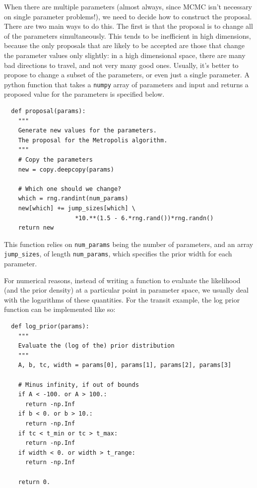 When there are multiple parameters (almost always, since MCMC isn't necessary
on single parameter problems!), we need to decide how to construct the proposal.
There are two main ways to do this. The first is that the proposal is to
change all of the parameters simultaneously. This tends to be inefficient in
high dimensions, because the only proposals that are likely to be accepted
are those that change the parameter values only slightly: in a high dimensional
space, there are many bad directions to travel, and not very many good ones.
Usually, it's better to propose to change a subset of the parameters, or even
just a single parameter. A python function that takes a {\tt numpy} array of
parameters and input and returns a proposed value for the parameters is
specified below.

\begin{verbatim}
  def proposal(params):
    """
    Generate new values for the parameters.
    The proposal for the Metropolis algorithm.
    """
    # Copy the parameters
    new = copy.deepcopy(params)

    # Which one should we change?
    which = rng.randint(num_params)
    new[which] += jump_sizes[which] \
                    *10.**(1.5 - 6.*rng.rand())*rng.randn()
    return new
\end{verbatim}
This function relies on {\tt num\_params} being the number of parameters,
and an array {\tt jump\_sizes}, of length {\tt num\_params}, which specifies
the prior width for each parameter.

For numerical reasons, instead of writing a function to evaluate the likelihood
(and the prior density) at a particular point in parameter space, we usually
deal with the logarithms of these quantities. For the transit example, the
log prior function can be implemented like so:

\begin{verbatim}
  def log_prior(params):
    """
    Evaluate the (log of the) prior distribution
    """
    A, b, tc, width = params[0], params[1], params[2], params[3]

    # Minus infinity, if out of bounds
    if A < -100. or A > 100.:
      return -np.Inf
    if b < 0. or b > 10.:
      return -np.Inf
    if tc < t_min or tc > t_max:
      return -np.Inf
    if width < 0. or width > t_range:
      return -np.Inf

    return 0.
\end{verbatim}

